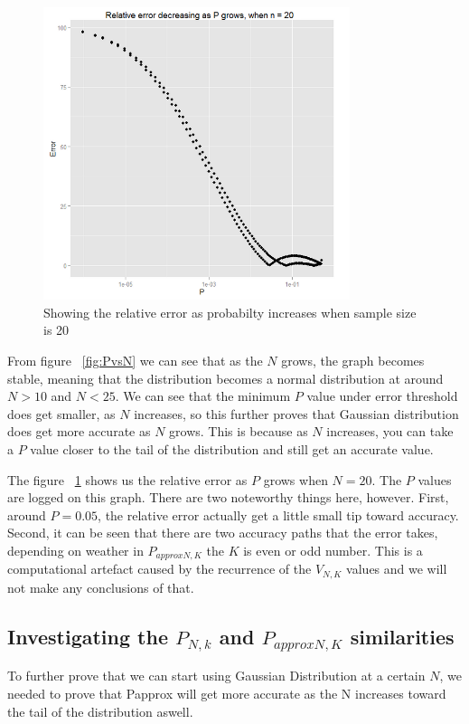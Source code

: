 \documentclass[12pt]{article}
\begin{document}
\begin{figure}[!ht]
	\centering
  \includegraphics[width=0.8\textwidth]{RelativeErrorDecreasingPgrowsN20}
	\caption{Showing the relative error as probabilty increases when sample size is 20}
	\label{fig:RelativeErrorDecresingPgrows}
\end{figure}

From figure ~\ref{fig:PvsN} we can see that as the $N$ grows, the graph becomes stable, meaning that the distribution becomes a normal distribution at around $N > 10$ and $N < 25$. We can see that the minimum $P$ value under error threshold does get smaller, as $N$ increases, so this further proves that Gaussian distribution does get more accurate as $N$ grows. This is because as $N$ increases, you can take a $P$ value closer to the tail of the distribution and still get an accurate value.

The figure ~\ref{fig:RelativeErrorDecresingPgrows} shows us the relative error as $P$ grows when $N = 20$. The $P$ values are logged on this graph. There are two noteworthy things here, however. First, around $P = 0.05$, the relative error actually get a little small tip toward accuracy. Second, it can be seen that there are two accuracy paths that the error takes, depending on weather in $P_{approx N, K}$  the $K$ is even or odd number. This is a computational artefact caused by the recurrence of the $V_{N, K}$ values and we will not make any conclusions of that.

\subsection{Investigating the $P_{N, k}$ and $P_{approx N, K}$ similarities}
To further prove that we can start using Gaussian Distribution at a certain $N$, we needed to prove that Papprox will get more accurate as the N increases toward the tail of the distribution aswell.
\end{document}
